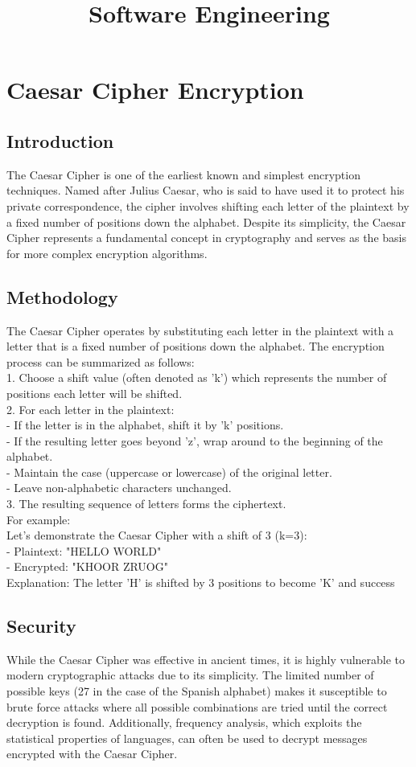 \documentclass[a4,10pt]{article}
\title{Software Engineering}
\begin{document}
\section{Caesar Cipher Encryption}
\subsection{Introduction}
The Caesar Cipher is one of the earliest known and simplest encryption techniques. Named after Julius Caesar, who is said to have used it to protect his private correspondence, the cipher involves shifting each letter of the plaintext by a fixed number of positions down the alphabet. Despite its simplicity, the Caesar Cipher represents a fundamental concept in cryptography and serves as the basis for more complex encryption algorithms.
\subsection{Methodology}

The Caesar Cipher operates by substituting each letter in the plaintext with a letter that is a fixed number of positions down the alphabet. The encryption process can be summarized as follows:\\
1. Choose a shift value (often denoted as 'k') which represents the number of positions each letter will be shifted.\\
2. For each letter in the plaintext:\\
- If the letter is in the alphabet, shift it by 'k' positions.\\
- If the resulting letter goes beyond 'z', wrap around to the beginning of the alphabet.\\
- Maintain the case (uppercase or lowercase) of the original letter.\\
- Leave non-alphabetic characters unchanged.\\
3. The resulting sequence of letters forms the ciphertext.\\

For example: \\
Let's demonstrate the Caesar Cipher with a shift of 3 (k=3):\\
- Plaintext: "HELLO WORLD"\\
- Encrypted: "KHOOR ZRUOG"\\
Explanation: The letter 'H' is shifted by 3 positions to become 'K' and success

\subsection{Security}
While the Caesar Cipher was effective in ancient times, it is highly vulnerable to modern cryptographic attacks due to its simplicity. The limited number of possible keys (27 in the case of the Spanish alphabet) makes it susceptible to brute force attacks where all possible combinations are tried until the correct decryption is found. Additionally, frequency analysis, which exploits the statistical properties of languages, can often be used to decrypt messages encrypted with the Caesar Cipher.
\end{document}
